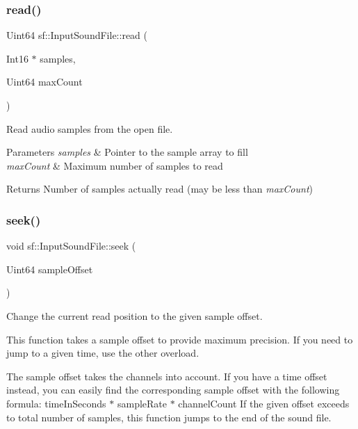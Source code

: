 \subsubsection{\texorpdfstring{read()}{read()}}
{\footnotesize\ttfamily Uint64 sf\+::\+Input\+Sound\+File\+::read (\begin{DoxyParamCaption}\item[{Int16 $\ast$}]{samples,  }\item[{Uint64}]{max\+Count }\end{DoxyParamCaption})}



Read audio samples from the open file. 


\begin{DoxyParams}{Parameters}
{\em samples} & Pointer to the sample array to fill \\
\hline
{\em max\+Count} & Maximum number of samples to read\\
\hline
\end{DoxyParams}
\begin{DoxyReturn}{Returns}
Number of samples actually read (may be less than {\itshape max\+Count}) \begin{DoxyVerb}\end{DoxyVerb}
 
\end{DoxyReturn}
\mbox{\label{classsf_1_1_input_sound_file_aaf97be15020a42e159ff88f76f22af20}} 
\subsubsection{\texorpdfstring{seek()}{seek()}\hspace{0.1cm}{\footnotesize\ttfamily [1/2]}}
{\footnotesize\ttfamily void sf\+::\+Input\+Sound\+File\+::seek (\begin{DoxyParamCaption}\item[{Uint64}]{sample\+Offset }\end{DoxyParamCaption})}



Change the current read position to the given sample offset. 

This function takes a sample offset to provide maximum precision. If you need to jump to a given time, use the other overload.

The sample offset takes the channels into account. If you have a time offset instead, you can easily find the corresponding sample offset with the following formula\+: {\ttfamily time\+In\+Seconds $\ast$ sample\+Rate $\ast$ channel\+Count} If the given offset exceeds to total number of samples, this function jumps to the end of the sound file.


